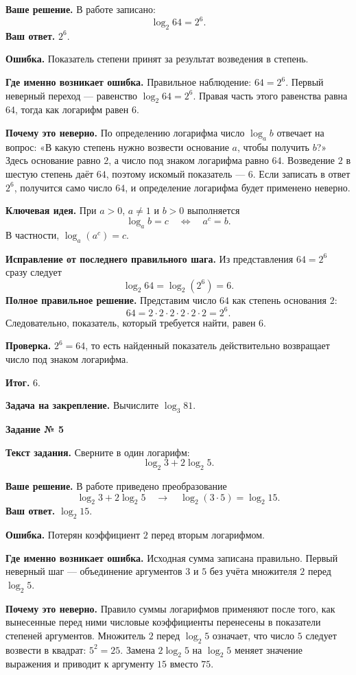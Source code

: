 \documentclass[a4paper,12pt]{article}
\newcommand{\keyidea}{\textcolor{darkaccent}{\textbf{Ключевая идея.}}}
\newcommand{\err}{\textcolor{alert}{\textbf{Ошибка.}}}
\newcommand{\result}{\textcolor{darkaccent}{\textbf{Итог.}}}
\newcommand{\taskheading}[1]{\begin{center}\Large\bfseries Задание № #1\end{center}\vspace{3mm}}
\begin{document}
\textbf{Ваше решение.} В работе записано:
\[
\log_2 64=2^6.
\]
\textbf{Ваш ответ.} $2^6$.

\err{} Показатель степени принят за результат возведения в степень.

\textbf{Где именно возникает ошибка.} Правильное наблюдение: $64=2^6$. Первый неверный переход --- равенство $\log_2 64=2^6$. Правая часть этого равенства равна $64$, тогда как логарифм равен $6$.

\textbf{Почему это неверно.} По определению логарифма число $\log_a b$ отвечает на вопрос: «В какую степень нужно возвести основание $a$, чтобы получить $b$?» Здесь основание равно $2$, а число под знаком логарифма равно $64$. Возведение $2$ в шестую степень даёт $64$, поэтому искомый показатель --- $6$. Если записать в ответ $2^6$, получится само число $64$, и определение логарифма будет применено неверно.

\keyidea{} При $a>0$, $a\ne1$ и $b>0$ выполняется
\[
\log_a b=c\quad\Longleftrightarrow\quad a^c=b.
\]
В частности, $\log_a(a^c)=c$.

\textbf{Исправление от последнего правильного шага.} Из представления $64=2^6$ сразу следует
\[
\log_2 64=\log_2(2^6)=6.
\]
\textbf{Полное правильное решение.} Представим число $64$ как степень основания $2$:
\[
64=2\cdot2\cdot2\cdot2\cdot2\cdot2=2^6.
\]
Следовательно, показатель, который требуется найти, равен $6$.

\textbf{Проверка.} $2^6=64$, то есть найденный показатель действительно возвращает число под знаком логарифма.

\result{} $\boxed{6}$.

\vspace{3mm}
\textbf{Задача на закрепление.} Вычислите $\log_3 81$.
\newpage
{}\label{task:5}
\taskheading{5}
\textbf{Текст задания.} Сверните в один логарифм:
\[\log_2 3+2\log_2 5.\]

\textbf{Ваше решение.} В работе приведено преобразование
\[
\log_2 3+2\log_2 5\quad\longrightarrow\quad\log_2(3\cdot5)=\log_2 15.
\]
\textbf{Ваш ответ.} $\log_2 15$.

\err{} Потерян коэффициент $2$ перед вторым логарифмом.

\textbf{Где именно возникает ошибка.} Исходная сумма записана правильно. Первый неверный шаг --- объединение аргументов $3$ и $5$ без учёта множителя $2$ перед $\log_2 5$.

\textbf{Почему это неверно.} Правило суммы логарифмов применяют после того, как вынесенные перед ними числовые коэффициенты перенесены в показатели степеней аргументов. Множитель $2$ перед $\log_2 5$ означает, что число $5$ следует возвести в квадрат: $5^2=25$. Замена $2\log_2 5$ на $\log_2 5$ меняет значение выражения и приводит к аргументу $15$ вместо $75$.
\end{document}
